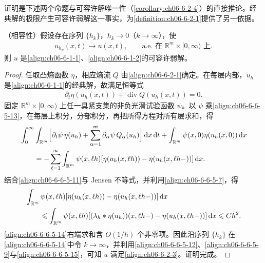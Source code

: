 \documentclass[../../main.tex]{subfiles}
\begin{document}
证明是下述两个命题与可容许解唯一性（\cref{corollary:ch06-6-2-4}）的直接推论。经典解的极限产生可容许弱解这一事实，为\cref{definition:ch06-6-2-1}提供了另一依据。

\begin{lemma}\label{lemma:ch06-6-5-2}
（相容性）假设存在序列 $\{h_{k}\}$，$h_{k}\to 0$（$k\to\infty$），使
\begin{align}
u_{h_{k}}(x,t)\to u(x,t),\qquad\text{a.e.\ 在 }\mathbb{R}^{m}\times[0,\infty)\text{ 上}.
\label{align:ch06-6-6-5-12}
\end{align}
则 $u$ 是\eqref{align:ch06-6-1-1}、\eqref{align:ch06-6-1-2}的可容许弱解。
\end{lemma}

\begin{proof}
任取凸熵函数 $\eta$，相应熵流 $Q$ 由\eqref{align:ch06-6-2-1}确定。在每层内部，$u_{h}$ 是\eqref{align:ch06-6-1-1}的经典解，故满足恒等式
\begin{align}
\partial_{t}\eta(u_{h}(x,t))+\operatorname{div}Q(u_{h}(x,t))=0.
\label{align:ch06-6-6-5-13}
\end{align}
固定 $\mathbb{R}^{m}\times[0,\infty)$ 上任一具紧支集的非负光滑试验函数 $\psi$。以 $\psi$ 乘\eqref{align:ch06-6-6-5-13}，在每层上积分，分部积分，再把所得方程对所有层求和，得
\begin{align}
&\int_{0}^{\infty}\int_{\mathbb{R}^{m}}\Bigl{[}\partial_{t}\psi\,\eta(u_{h})+\sum_{\alpha=1}^{m}\partial_{\alpha}\psi\,Q_{\alpha}(u_{h})\Bigr{]}\,\mathrm{d}x\,\mathrm{d}t+\int_{\mathbb{R}^{m}}\psi(x,0)\eta(u_{h}(x,0))\,\mathrm{d}x\notag\\
&\qquad=-\sum_{\ell=1}^{\infty}\int_{\mathbb{R}^{m}}\psi(x,\ell h)[\eta(u_{h}(x,\ell h))-\eta(u_{h}(x,\ell h-))]\,\mathrm{d}x.
\label{align:ch06-6-6-5-14}
\end{align}
结合\eqref{align:ch06-6-6-5-11}与 Jensen 不等式，并利用\eqref{align:ch06-6-6-5-7}，得
\begin{align}
&\int_{\mathbb{R}^{m}}\psi(x,\ell h)[\eta(u_{h}(x,\ell h))-\eta(u_{h}(x,\ell h-))]\,\mathrm{d}x\notag\\
&\qquad\leqslant\int_{\mathbb{R}^{m}}\psi(x,\ell h)[(\lambda_{h}*\eta(u_{h}))(x,\ell h-)-\eta(u_{h}(x,\ell h-))]\,\mathrm{d}x\leqslant Ch^{2}.
\label{align:ch06-6-6-5-15}
\end{align}
\eqref{align:ch06-6-6-5-14}右端求和含 $O(1/h)$ 个非零项。因此沿序列 $\{h_{k}\}$ 在\eqref{align:ch06-6-6-5-14}中令 $k\to\infty$，并利用\eqref{align:ch06-6-6-5-12}、\eqref{align:ch06-6-6-5-9}与\eqref{align:ch06-6-6-5-15}，可知 $u$ 满足\eqref{align:ch06-6-2-3}。证明完成。
\end{proof}
\end{document}
